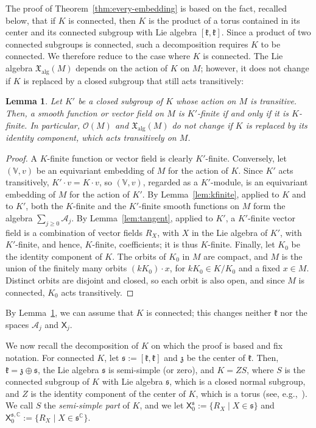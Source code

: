 \documentclass{article}
\newcommand{\C}{\mathbb{C}}
\newcommand{\frakk}{\mathfrak{k}}
\newcommand{\fraks}{\mathfrak{s}}
\newcommand{\frakz}{\mathfrak{z}}
\newcommand{\xalg}{\mathfrak X_{\mathrm{alg}}}
\newcommand{\sX}{\mathsf{X}}
\newcommand{\Ocal}{\mathcal{O}}
\newcommand{\xc}[1]{\vspace{.1cm}
\noindent {\em #1} }
\newtheorem{lemma}{Lemma}
\theoremstyle{definition}
\theoremstyle{plain}
\begin{document}
\xc{Reduction to connected $K$:}
The proof of Theorem~\ref{thm:every-embedding} is based on the fact, recalled below, that if $K$ is connected, then $K$ is the product of a torus contained in its center and its connected subgroup with Lie algebra $[\frakk,\frakk]$.
Since a product of two connected subgroups is connected, such a decomposition requires $K$ to be connected.
We therefore reduce to the case where $K$ is connected.
The Lie algebra $\xalg(M)$ depends on the action of $K$ on $M$; however, it does not change if $K$ is replaced by a closed subgroup that still acts transitively:

\begin{lemma}\label{lem:subgroup}
Let $K'$ be a closed subgroup of $K$ whose action on $M$ is transitive. Then, a smooth function or vector field on $M$ is $K'$-finite if and only if it is $K$-finite.
In particular, $\Ocal(M)$ and $\xalg(M)$ do not change if $K$ is replaced by its identity component, which acts transitively on $M$.
\end{lemma}


\begin{proof}
A $K$-finite function or vector field is clearly $K'$-finite.
Conversely, let $(\mathbb V,v)$ be an equivariant embedding of $M$ for the action of $K$.  Since $K'$ acts transitively,
    $K'\cdot v=K\cdot v$, so $(\mathbb V,v)$, regarded as a $K'$-module, is an equivariant embedding of $M$ for the action of $K'$.
By Lemma~\ref{lem:kfinite}, applied to $K$ and to $K'$, both the $K$-finite and the $K'$-finite smooth functions on $M$ form the algebra $\sum_{j\geq0}\mathcal A_j$.
By Lemma~\ref{lem:tangent}, applied to $K'$, a $K'$-finite vector field is a combination of vector fields $R_X$, with $X$ in the Lie algebra of $K'$, with $K'$-finite, and hence, $K$-finite, coefficients; it is thus $K$-finite.
Finally, let $K_0$ be the identity component of $K$. The orbits of $K_0$ in $M$ are compact, and $M$ is the union of the finitely many orbits $(kK_0)\cdot x$, for $kK_0\in K/K_0$ and a fixed $x\in M$.
Distinct orbits are disjoint and closed, so each orbit is also open, and since $M$ is connected, $K_0$ acts transitively.
\end{proof}

By Lemma~\ref{lem:subgroup}, we can assume that $K$ is connected; this changes neither $\frakk$ nor the spaces $\mathcal A_j$ and $\sX_j$.




\xc{The semi-simple part:}
We now recall the decomposition of $K$ on which the proof is based and fix notation.
For connected $K$, let $\fraks:=[\frakk,\frakk]$ and $\frakz$ be the center of $\frakk$.
Then, $\frakk=\frakz\oplus\fraks$, the Lie algebra $\fraks$ is semi-simple (or zero), and $K=ZS$, where $S$ is the connected subgroup of $K$ with Lie algebra $\fraks$, which is a closed normal subgroup,
and $Z$ is the identity component of the center of $K$, which is a torus (see, e.g.,~\cite[Chapter~V]{BtD}).
We call $S$ the {\it semi-simple part} of $K$, and we let $\sX_0^{\fraks}:=\{R_X\mid X\in\fraks\}$ and $\sX_0^{\fraks,\C}:=\{R_X\mid X\in\fraks^\C\}$.
\end{document}
